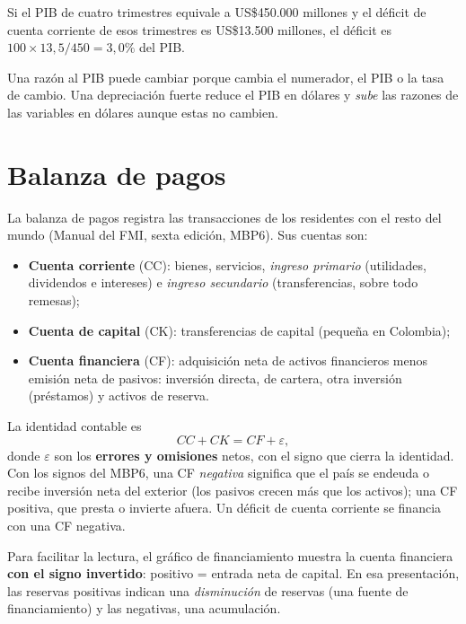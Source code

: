 \begin{dato}
Si el PIB de cuatro trimestres equivale a US\$450.000 millones y el déficit de cuenta corriente de esos trimestres es
US\$13.500 millones, el déficit es $100\times13{,}5/450=3{,}0\%$ del PIB.
\end{dato}

\begin{alerta}
Una razón al PIB puede cambiar porque cambia el numerador, el PIB o la tasa de cambio. Una depreciación fuerte reduce
el PIB en dólares y \emph{sube} las razones de las variables en dólares aunque estas no cambien.
\end{alerta}

\section{Balanza de pagos}
\label{es:f:bp}
La balanza de pagos registra las transacciones de los residentes con el resto del mundo (Manual del FMI, sexta
edición, MBP6). Sus cuentas son:
\begin{itemize}
\item \textbf{Cuenta corriente} (CC): bienes, servicios, \emph{ingreso primario} (utilidades, dividendos e
  intereses) e \emph{ingreso secundario} (transferencias, sobre todo remesas);
\item \textbf{Cuenta de capital} (CK): transferencias de capital (pequeña en Colombia);
\item \textbf{Cuenta financiera} (CF): adquisición neta de activos financieros menos emisión neta de pasivos:
  inversión directa, de cartera, otra inversión (préstamos) y activos de reserva.
\end{itemize}
La identidad contable es
\[
CC+CK=CF+\varepsilon,
\]
donde $\varepsilon$ son los \textbf{errores y omisiones} netos, con el signo que cierra la identidad. Con los signos del
MBP6, una CF \emph{negativa} significa que el país se endeuda o recibe inversión neta del exterior (los pasivos crecen
más que los activos); una CF positiva, que presta o invierte afuera. Un déficit de cuenta corriente se financia con una
CF negativa.

\begin{leer}
Para facilitar la lectura, el gráfico de financiamiento muestra la cuenta financiera \textbf{con el signo
invertido}: positivo = entrada neta de capital. En esa presentación, las reservas positivas indican una
\emph{disminución} de reservas (una fuente de financiamiento) y las negativas, una acumulación.
\end{leer}

